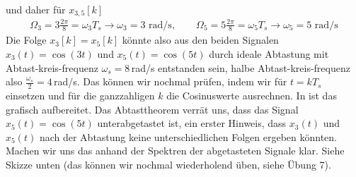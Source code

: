\begin{ExCalc}
\begin{align}
\end{align}
und daher für $x_{3,5}[k]$
\begin{align}
\Omega_3 = 3\frac{2\pi}{8} = \omega_3 T_s \rightarrow \omega_3 = 3 \text{ rad/s},\quad\quad
\Omega_5 = 5\frac{2\pi}{8} = \omega_5 T_s \rightarrow \omega_5 = 5 \text{ rad/s}
\end{align}
%
Die Folge $x_3[k]=x_5[k]$ könnte also aus den beiden Signalen $x_3(t)=\cos(3 t)$
und $x_5(t) = \cos(5 t)$ durch ideale Abtastung mit Abtast-kreis-frequenz
$\omega_s = 8$\,rad/s entstanden sein, halbe Abtast-kreis-frequenz also
$\frac{\omega_s}{2} = 4$\,rad/s.
%
Das können wir nochmal prüfen, indem wir für $t=k T_s$
einsetzen und für die ganzzahligen $k$ die Cosinuswerte ausrechnen.
In  ist das grafisch aufbereitet.
%
Das Abtasttheorem verrät uns, dass das Signal $x_5(t) = \cos(5 t)$ unterabgetastet
ist, ein erster Hinweis, dass $x_3(t)$ und $x_5(t)$ nach der Abtastung keine
unterschiedlichen Folgen ergeben könnten.
%
Machen wir uns das anhand der Spektren der abgetasteten Signale klar. Siehe Skizze
unten (das können wir nochmal wiederholend üben, siehe Übung 7).
%
\begin{center}
\end{center}
\end{ExCalc}
